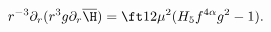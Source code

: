 \begin{equation}
r^{-3}\partial_r(r^3g\partial_r\overline{\H})=\ft12\mu^2(H_5f^{4\alpha}g^2-1).
\end{equation}

